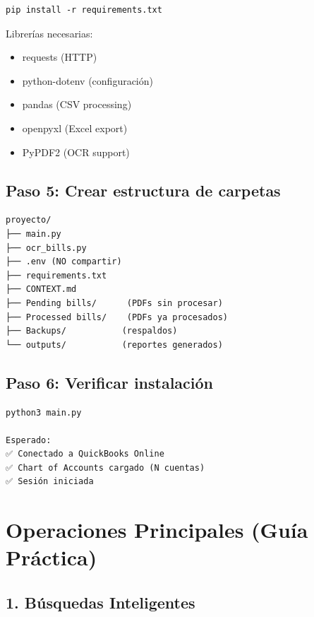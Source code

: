 \documentclass[12pt,oneside]{article}
\begin{document}
\begin{verbatim}
pip install -r requirements.txt
\end{verbatim}

Librerías necesarias:
\begin{itemize}
    \item requests (HTTP)
    \item python-dotenv (configuración)
    \item pandas (CSV processing)
    \item openpyxl (Excel export)
    \item PyPDF2 (OCR support)
\end{itemize}

\subsection{Paso 5: Crear estructura de carpetas}

\begin{verbatim}
proyecto/
├── main.py
├── ocr_bills.py
├── .env (NO compartir)
├── requirements.txt
├── CONTEXT.md
├── Pending bills/      (PDFs sin procesar)
├── Processed bills/    (PDFs ya procesados)
├── Backups/           (respaldos)
└── outputs/           (reportes generados)
\end{verbatim}

\subsection{Paso 6: Verificar instalación}

\begin{verbatim}
python3 main.py

Esperado:
✅ Conectado a QuickBooks Online
✅ Chart of Accounts cargado (N cuentas)
✅ Sesión iniciada
\end{verbatim}

\newpage

\section{Operaciones Principales (Guía Práctica)}

\subsection{1. Búsquedas Inteligentes}
\end{document}
